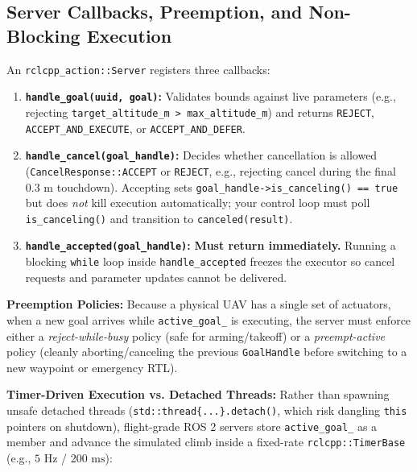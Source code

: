 \documentclass{article}
\begin{document}
\subsection{Server Callbacks, Preemption, and Non-Blocking Execution}
An \texttt{rclcpp\_action::Server} registers three callbacks:
\begin{enumerate}
    \item \textbf{\texttt{handle\_goal(uuid, goal)}:} Validates bounds against live parameters (e.g., rejecting \texttt{target\_altitude\_m > max\_altitude\_m}) and returns \texttt{REJECT}, \texttt{ACCEPT\_AND\_EXECUTE}, or \texttt{ACCEPT\_AND\_DEFER}.
    \item \textbf{\texttt{handle\_cancel(goal\_handle)}:} Decides whether cancellation is allowed (\texttt{CancelResponse::ACCEPT} or \texttt{REJECT}, e.g., rejecting cancel during the final $0.3\text{ m}$ touchdown). Accepting sets \texttt{goal\_handle->is\_canceling() == true} but does \textit{not} kill execution automatically; your control loop must poll \texttt{is\_canceling()} and transition to \texttt{canceled(result)}.
    \item \textbf{\texttt{handle\_accepted(goal\_handle)}:} \textbf{Must return immediately.} Running a blocking \texttt{while} loop inside \texttt{handle\_accepted} freezes the executor so cancel requests and parameter updates cannot be delivered.
\end{enumerate}

\textbf{Preemption Policies:} Because a physical UAV has a single set of actuators, when a new goal arrives while \texttt{active\_goal\_} is executing, the server must enforce either a \textit{reject-while-busy} policy (safe for arming/takeoff) or a \textit{preempt-active} policy (cleanly aborting/canceling the previous \texttt{GoalHandle} before switching to a new waypoint or emergency RTL).

\textbf{Timer-Driven Execution vs. Detached Threads:} Rather than spawning unsafe detached threads (\texttt{std::thread\{...\}.detach()}, which risk dangling \texttt{this} pointers on shutdown), flight-grade ROS 2 servers store \texttt{active\_goal\_} as a member and advance the simulated climb inside a fixed-rate \texttt{rclcpp::TimerBase} (e.g., $5\text{ Hz}$ / $200\text{ ms}$):
\end{document}
